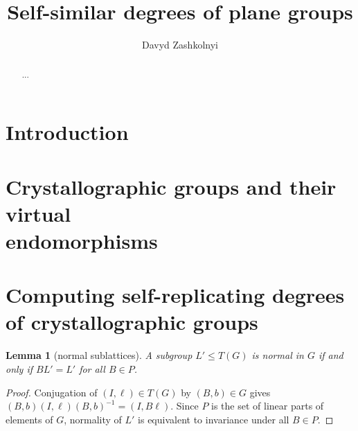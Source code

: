 \documentclass[12pt]{article}
\title{Self-similar degrees of plane groups}
\author{ Davyd Zashkolnyi }
\newtheorem{lemma}[theorem]{Lemma}
\theoremstyle{definition}
\begin{document}
\maketitle
\begin{abstract}
   ...
\end{abstract}





\section*{Introduction}



\section{Crystallographic groups and their virtual \\ endomorphisms}\label{sec:cryst}




\section{Computing self-replicating degrees of crystallographic groups}\label{sec:computations}


\begin{lemma}[normal sublattices]\label{lemma:normal-sublattices}
A subgroup $L'\le T(G)$ is normal in $G$ if and only if $BL'=L'$ for all
$B\in P$.
\end{lemma}
\begin{proof}
Conjugation of $(I,\ell)\in T(G)$ by $(B,b)\in G$ gives
$(B,b)(I,\ell)(B,b)^{-1}=(I,B\ell)$. Since $P$ is the set of linear
parts of elements of $G$, normality of $L'$ is equivalent to invariance
under all $B\in P$.
\end{proof}
\end{document}
